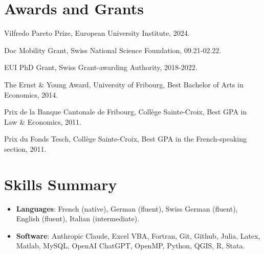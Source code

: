 \documentclass[letterpaper,11pt]{article}
\newcommand{\resumeItem}[2]{
  \item\small{
    \textbf{#1}{: #2 \vspace{-2pt}}
  }
}
\newcommand{\resumeSubItem}[2]{\resumeItem{#1}{#2}\vspace{-1pt}}
\newcommand{\resumeSubHeadingListStart}{\begin{itemize}[leftmargin=*]}
\newcommand{\resumeSubHeadingListEnd}{\end{itemize}}
\begin{document}
\section{Awards and Grants}
\begin{description}[font=$\bullet$]
\item {Vilfredo Pareto Prize, European University Institute, 2024.} 
\item {Doc Mobility Grant, Swiss National Science Foundation, 09.21-02.22.} 
\item {EUI PhD Grant, Swiss Grant-awarding Authority, 2018-2022.} 
\item {The Ernst \& Young Award, University of Fribourg, Best Bachelor of Arts in Economics, 2014.} 
\item {Prix de la Banque Cantonale de Fribourg, Coll\`{e}ge Sainte-Croix, Best GPA in Law \& Economics, 2011.}
\item {Prix du Fonds Tesch, Coll\`{e}ge Sainte-Croix, Best GPA in the French-speaking section, 2011.}
\end{description}


%
\section{Skills Summary}
	\resumeSubHeadingListStart
	\resumeSubItem{Languages}{French (native), German (fluent), Swiss German (fluent), English (fluent), Italian (intermediate).}
	\resumeSubItem{Software}{Anthropic Claude, Excel VBA, Fortran, Git, Github, Julia, Latex, Matlab, MySQL, OpenAI ChatGPT, OpenMP, Python, QGIS, R, Stata.}
\resumeSubHeadingListEnd

\end{document}
